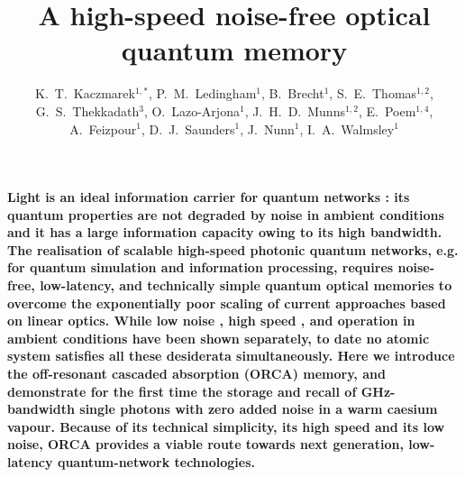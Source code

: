\documentclass[12pt]{iopart}
\begin{document}
\title[]{A high-speed noise-free optical quantum memory}

\author{K.~T.~Kaczmarek$^{1,*}$, P.~M.~Ledingham$^1$, B.~Brecht$^1$, S.~E.~Thomas$^{1,2}$, G.~S.~Thekkadath$^3$, O.~Lazo-Arjona$^1$, J.~H.~D.~Munns$^{1,2}$, E.~Poem$^{1,4}$, A.~Feizpour$^1$, D.~J.~Saunders$^1$, J.~Nunn$^1$, I.~A.~Walmsley$^1$}
\address{$^1$Clarendon Laboratory, University of Oxford, Parks Road, Oxford, OX1 3PU, UK.\\
$^2$QOLS, Blackett Laboratory, Imperial College London, London SW7 2BW, UK. \\
$^3$University of Ottawa, 25 Templeton St, Ottawa, K1N 6N5, Canada.\\
$^4$Department of Physics of Complex Systems, Weizmann Institute of Science, Rehovot 7610001, Israel.}

\maketitle

\textbf{Light is an ideal information carrier for quantum networks \cite{Kimble2008}: its quantum properties are not degraded by noise in ambient conditions and it has a large information capacity owing to its high bandwidth. The realisation of scalable high-speed photonic quantum networks, e.g. for quantum simulation and information processing, requires noise-free, low-latency, and technically simple quantum optical memories to overcome the exponentially poor scaling of current approaches based on linear optics. While low noise \cite{Chaneliere2005,Zhou2012,Maxwell2013,Ding2016,Distante2017,Seri2017}, high speed \cite{England2015}, and operation in ambient conditions \cite{Julsgaard2004,Hosseini2011,Ripka2016,Sibalic2016} have been shown separately, to date no atomic system satisfies all these desiderata simultaneously. Here we introduce the off-resonant cascaded absorption (ORCA) memory, and demonstrate for the first time the storage and recall of GHz-bandwidth single photons with zero added noise in a warm caesium vapour. Because of its technical simplicity, its high speed and its low noise, ORCA provides a viable route towards next generation, low-latency quantum-network technologies.}
\end{document}
